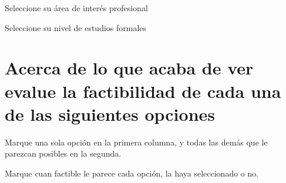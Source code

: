 \documentclass[
  spanish,
  a4paper, %
  globalid=1003, %
  print_questionnaire_id,
  pagemark,
  stamp]{sdaps}
\begin{document}
\begin{questionnaire}[noinfo]
\begin{choicequestion}[3]{Seleccione su área de interés profesional}

	\end{choicequestion}

	\begin{choicequestion}[3]{Seleccione su nivel de estudios formales}



	\end{choicequestion}

    \section{Acerca de lo que acaba de ver evalue la factibilidad de cada una de las siguientes opciones}
    
      \begin{multicols}{2}
      \begin{choicegroup}{Marque una sola opción en la primera columna, y todas las demás que le parezcan posibles en la segunda.}
      
      \end{choicegroup}

	\setcounter{markcheckboxcount}{7}
	\begin{markgroup}{Marque cuan factible le parece cada opción, la haya seleccionado o no.}
	\end{markgroup}

    \end{multicols}

    \setcounter{markcheckboxcount}{10}  



\end{questionnaire}
\end{document}
